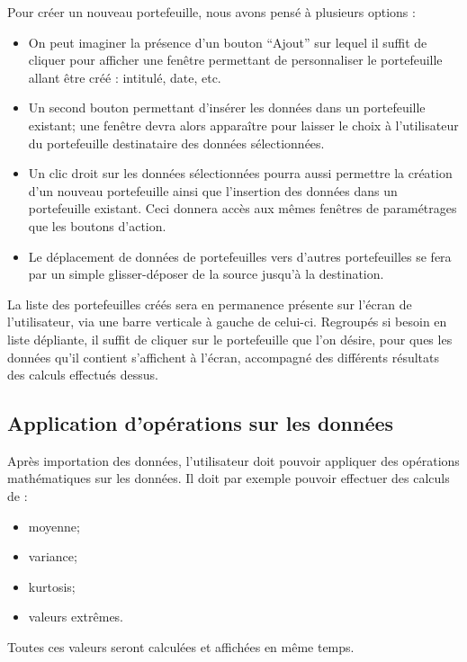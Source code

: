 		Pour créer un nouveau portefeuille, nous avons pensé à plusieurs options :
		\begin{itemize}
			\item On peut imaginer la présence d’un bouton “Ajout” sur lequel il suffit de cliquer pour afficher une fenêtre permettant de personnaliser le portefeuille allant être créé : intitulé, date, etc.
			\item Un second bouton permettant d’insérer les données dans un portefeuille existant; une fenêtre devra alors apparaître pour laisser le choix à l’utilisateur du portefeuille destinataire des données sélectionnées.
			\item Un clic droit sur les données sélectionnées pourra aussi permettre la création d’un nouveau portefeuille ainsi que l’insertion des données dans un portefeuille existant. Ceci donnera accès aux mêmes fenêtres de paramétrages que les boutons d’action.
			\item Le déplacement de données de portefeuilles vers d’autres portefeuilles se fera par un simple glisser-déposer de la source jusqu’à la destination. 
		\end{itemize}

		La liste des portefeuilles créés sera en permanence présente sur l’écran de l’utilisateur, via une barre verticale à gauche de celui-ci.
		Regroupés si besoin en liste dépliante, il suffit de cliquer sur le portefeuille que l’on désire, pour ques les données qu’il contient s’affichent à l’écran, accompagné des différents résultats des calculs effectués dessus. 



	\subsection{Application d’opérations sur les données}

		Après importation des données, l’utilisateur doit pouvoir appliquer des opérations mathématiques sur les données.
		Il doit par exemple pouvoir effectuer des calculs de :
		\begin{itemize}
			\item moyenne;
			\item variance;
			\item kurtosis;
			\item valeurs extrêmes.
		\end{itemize}
		Toutes ces valeurs seront calculées et affichées en même temps.


